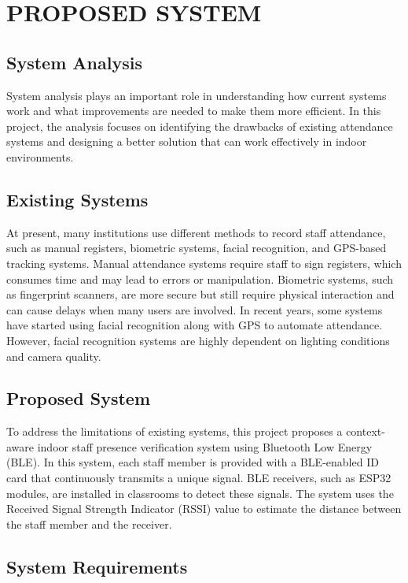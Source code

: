 \chapter{PROPOSED SYSTEM}

\section{System Analysis}
System analysis plays an important role in understanding how current systems work and what improvements are needed to make them more efficient. In this project, the analysis focuses on identifying the drawbacks of existing attendance systems and designing a better solution that can work effectively in indoor environments. 

\section{Existing Systems}
At present, many institutions use different methods to record staff attendance, such as manual registers, biometric systems, facial recognition, and GPS-based tracking systems. Manual attendance systems require staff to sign registers, which consumes time and may lead to errors or manipulation. Biometric systems, such as fingerprint scanners, are more secure but still require physical interaction and can cause delays when many users are involved. In recent years, some systems have started using facial recognition along with GPS to automate attendance. However, facial recognition systems are highly dependent on lighting conditions and camera quality. 

\section{Proposed System}
To address the limitations of existing systems, this project proposes a context-aware indoor staff presence verification system using Bluetooth Low Energy (BLE). In this system, each staff member is provided with a BLE-enabled ID card that continuously transmits a unique signal. BLE receivers, such as ESP32 modules, are installed in classrooms to detect these signals. The system uses the Received Signal Strength Indicator (RSSI) value to estimate the distance between the staff member and the receiver. 

\section{System Requirements}

